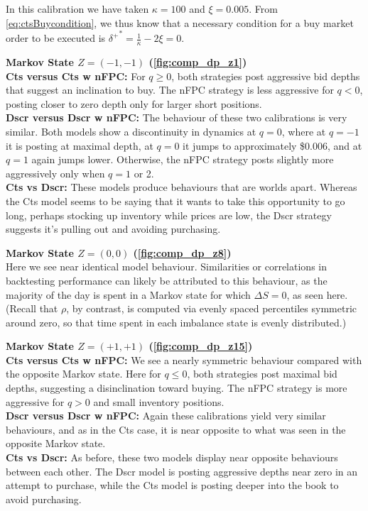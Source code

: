 In this calibration we have taken $\kappa=100$ and $\xi = 0.005$. From \eqref{eq:ctsBuycondition}, we thus know that a necessary condition for a buy market order to be executed is ${\delta^+}^* =  \frac{1}{\kappa} - 2 \xi = 0$.

{\bf Markov State $Z=(-1,-1)$ (\autoref{fig:comp_dp_z1})} \\
{\bf Cts versus Cts w nFPC:} For $q \geq 0$, both strategies post aggressive bid depths that suggest an inclination to buy. The nFPC strategy is less aggressive for $q<0$, posting closer to zero depth only for larger short positions.  \\
{\bf Dscr versus Dscr w nFPC:} The behaviour of these two calibrations is very similar. Both models show a discontinuity in dynamics at $q=0$, where at $q=-1$ it is posting at maximal depth, at $q=0$ it jumps to approximately \$0.006, and at $q=1$ again jumps lower. Otherwise, the nFPC strategy posts slightly more aggressively only when $q=1$ or 2. \\
{\bf Cts vs Dscr:} These models produce behaviours that are worlds apart. Whereas the Cts model seems to be saying that it wants to take this opportunity to go long, perhaps stocking up inventory while prices are low, the Dscr strategy suggests it's pulling out and avoiding purchasing. 

{\bf Markov State $Z=(0,0)$ (\autoref{fig:comp_dp_z8})}\\
Here we see near identical model behaviour. Similarities or correlations in backtesting performance can likely be attributed to this behaviour, as the majority of the day is spent in a Markov state for which $\Delta S = 0$, as seen here. (Recall that $\rho$, by contrast, is computed via evenly spaced percentiles symmetric around zero, so that time spent in each imbalance state is evenly distributed.)

{\bf Markov State $Z=(+1,+1)$ (\autoref{fig:comp_dp_z15})}\\
{\bf Cts versus Cts w nFPC:} We see a nearly symmetric behaviour compared with the opposite Markov state. Here for $q \leq 0$, both strategies post maximal bid depths, suggesting a disinclination toward buying. The nFPC strategy is more aggressive for $q>0$ and small inventory positions.\\
{\bf Dscr versus Dscr w nFPC:} Again these calibrations yield very similar behaviours, and as in the Cts case, it is near opposite to what was seen in the opposite Markov state.\\
{\bf Cts vs Dscr:} As before, these two models display near opposite behaviours between each other. The Dscr model is posting aggressive depths near zero in an attempt to purchase, while the Cts model is posting deeper into the book to avoid purchasing.

